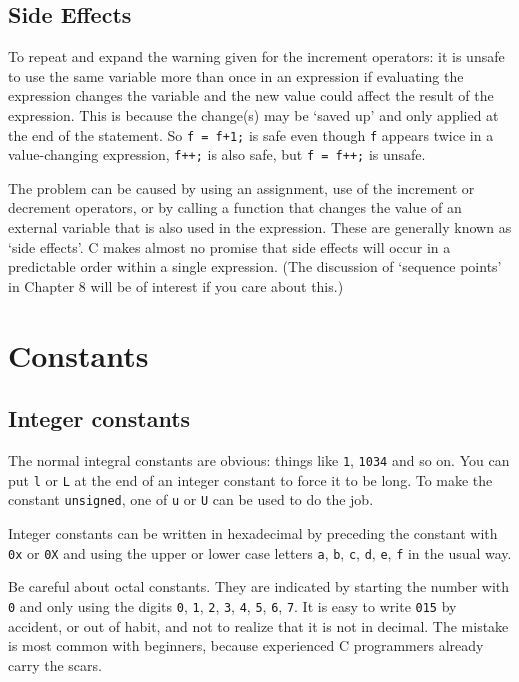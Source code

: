   

  \subsection{Side Effects}
   

   To repeat and expand the warning given for the increment operators: it
    is unsafe to use the same variable more than once in an expression if
    evaluating the expression changes the variable and the new value could
    affect the result of the expression. This is because the change(s) may be
    `saved up' and only applied at the end of the statement.
    So \texttt{f = f+1;} is safe even though \texttt{f}
    appears twice in a value-changing expression, \texttt{f++;} is
    also safe, but \texttt{f = f++;} is unsafe.


   The problem can be caused by using an assignment, use of the increment
    or decrement operators, or by calling a function that changes the value of
    an external variable that is also used in the expression. These are
    generally known as `side effects'. C makes almost no promise
    that side effects will occur in a predictable order within a single
    expression. (The discussion of `sequence points' in Chapter 8 will be of interest if you care about this.)


  

 
        \section{Constants}
        

  

  \subsection{Integer constants}
   

   The normal integral constants are obvious: things
    like \texttt{1}, \texttt{1034} and so on. You can
    put \texttt{l} or \texttt{L} at the end of an integer
    constant to force it to be long. To make the constant
    \texttt{unsigned}, one of \texttt{u} or \texttt{U}
    can be used to do the job.


   Integer constants can be written in hexadecimal by preceding the
    constant with \texttt{0x} or \texttt{0X} and using the
    upper or lower case letters \texttt{a}, \texttt{b},
    \texttt{c}, \texttt{d}, \texttt{e}, \texttt{f} in the
    usual way.


   Be careful about octal constants. They are indicated by starting the
    number with \texttt{0} and only using the
    digits \texttt{0}, \texttt{1}, \texttt{2},
    \texttt{3}, \texttt{4}, \texttt{5}, \texttt{6},
    \texttt{7}. It is easy to write \texttt{015} by accident, or
    out of habit, and not to realize that it is not in decimal. The mistake is
    most common with beginners, because experienced C programmers already
    carry the scars.


